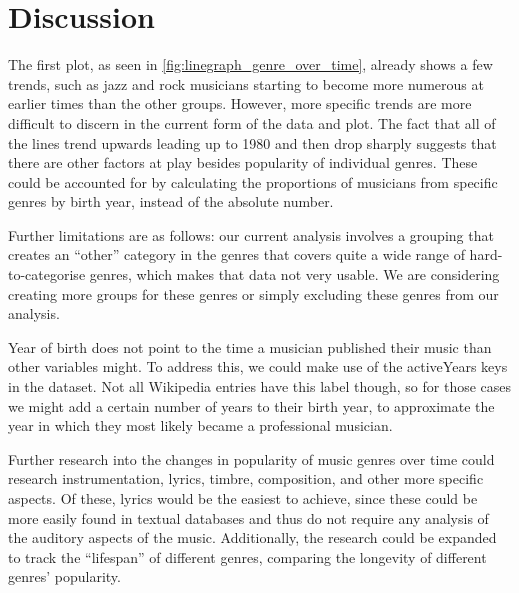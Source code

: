 \documentclass{article}
\begin{document}
\section{Discussion}
The first plot, as seen in \autoref{fig:linegraph_genre_over_time}, already shows a few trends, such as jazz and rock musicians starting to become more numerous at earlier times than the other groups. However, more specific trends are more difficult to discern in the current form of the data and plot. The fact that all of the lines trend upwards leading up to 1980 and then drop sharply suggests that there are other factors at play besides popularity of individual genres. These could be accounted for by calculating the proportions of musicians from specific genres by birth year, instead of the absolute number. 

Further limitations are as follows: our current analysis involves a grouping that creates an “other” category in the genres that covers quite a wide range of hard-to-categorise genres, which makes that data not very usable. We are considering creating more groups for these genres or simply excluding these genres from our analysis.

Year of birth does not point to the time a musician published their music than other variables might. To address this, we could make use of the activeYears keys in the dataset. Not all Wikipedia entries have this label though, so for those cases we might add a certain number of years to their birth year, to approximate the year in which they most likely became a professional musician.

Further research into the changes in popularity of music genres over time could research instrumentation, lyrics, timbre, composition, and other more specific aspects. Of these, lyrics would be the easiest to achieve, since these could be more easily found in textual databases and thus do not require any analysis of the auditory aspects of the music. Additionally, the research could be expanded to track the “lifespan” of different genres, comparing the longevity of different genres’ popularity. 
\end{document}
